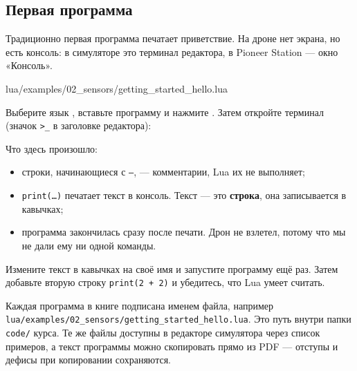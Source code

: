 \subsection{Первая программа}

Традиционно первая программа печатает приветствие. На дроне нет экрана, но есть консоль: в симуляторе это терминал редактора, в Pioneer Station --- окно «Консоль».

\begin{codefile}{lua/examples/02_sensors/getting_started_hello.lua}
\end{codefile}

Выберите язык , вставьте программу и нажмите . Затем откройте терминал (значок \texttt{>\_} в заголовке редактора):

\begin{center}
\end{center}

Что здесь произошло:
\begin{itemize}
    \item строки, начинающиеся с \texttt{--}, --- комментарии, Lua их не выполняет;
    \item \texttt{print(\dots)} печатает текст в консоль. Текст --- это \textbf{строка}, она записывается в кавычках;
    \item программа закончилась сразу после печати. Дрон не взлетел, потому что мы не дали ему ни одной команды.
\end{itemize}

\begin{taskbox}
Измените текст в кавычках на своё имя и запустите программу ещё раз. Затем добавьте вторую строку \texttt{print(2 + 2)} и убедитесь, что Lua умеет считать.
\end{taskbox}

\begin{infobox}
Каждая программа в книге подписана именем файла, например \texttt{lua/examples/02\_sensors/getting\_started\_hello.lua}. Это путь внутри папки \texttt{code/} курса. Те же файлы доступны в редакторе симулятора через список примеров, а текст программы можно скопировать прямо из PDF --- отступы и дефисы при копировании сохраняются.
\end{infobox}
